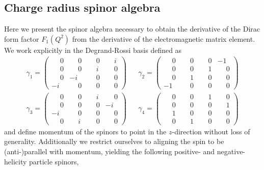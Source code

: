 \documentclass[prd,aps,twocolumn,superscriptaddress,tightenlines,nofootinbib,floatfix,preprintnumbers,10pt]{revtex4-1}
\begin{document}
\subsection{Charge radius spinor algebra}
Here we present the spinor algebra necessary to obtain the derivative of the Dirac form factor $F_1(Q^2)$ from the derivative of the electromagnetic matrix element. We work explicitly in the Degrand-Rossi basis defined as
\begin{align}
\gamma_1 = \begin{pmatrix}
\phantom{-}0&\phantom{-}0&\phantom{-}0&\phantom{-}i\\
\phantom{-}0&\phantom{-}0&\phantom{-}i&\phantom{-}0\\
\phantom{-}0&-i&\phantom{-}0&\phantom{-}0\\
-i&\phantom{-}0&\phantom{-}0&\phantom{-}0
\end{pmatrix} &&
\gamma_2=\begin{pmatrix}
\phantom{-}0&\phantom{-}0&\phantom{-}0&-1\\
\phantom{-}0&\phantom{-}0&\phantom{-}1&\phantom{-}0\\
\phantom{-}0&\phantom{-}1&\phantom{-}0&\phantom{-}0\\
-1&\phantom{-}0&\phantom{-}0&\phantom{-}0
\end{pmatrix}\nonumber\\
\gamma_3=\begin{pmatrix}
\phantom{-}0&\phantom{-}0&\phantom{-}i&\phantom{-}0\\
\phantom{-}0&\phantom{-}0&\phantom{-}0&-i\\
-i&\phantom{-}0&\phantom{-}0&\phantom{-}0\\
\phantom{-}0&\phantom{-}i&\phantom{-}0&\phantom{-}0
\end{pmatrix}
&&
\gamma_4=\begin{pmatrix}
\phantom{-}0&\phantom{-}0&\phantom{-}1&\phantom{-}0\\
\phantom{-}0&\phantom{-}0&\phantom{-}0&\phantom{-}1\\
\phantom{-}1&\phantom{-}0&\phantom{-}0&\phantom{-}0\\
\phantom{-}0&\phantom{-}1&\phantom{-}0&\phantom{-}0
\end{pmatrix}
\end{align}
and define momentum of the spinors to point in the $z$-direction without loss of generality. Additionally we restrict ourselves to aligning the spin to be (anti-)parallel with momentum, yielding the following positive- and negative-helicity particle spinors,
\end{document}
